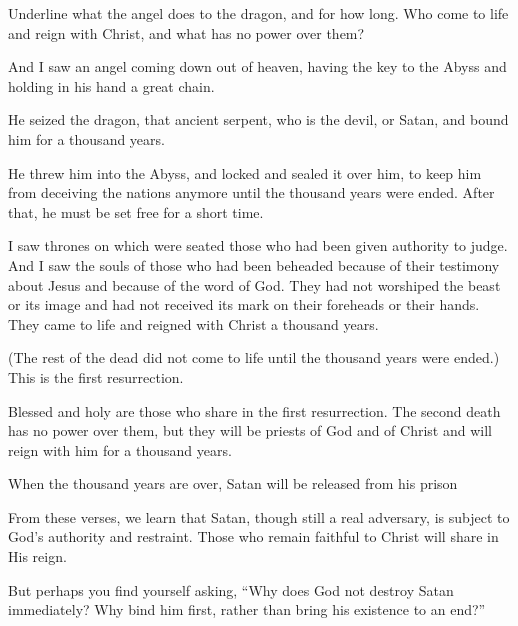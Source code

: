 \begin{ScriptureBox2}{Underline what the angel does to the dragon, and for how long. Who come to life and reign with Christ, and what has no power over them?}

\item[20:1] And I saw an angel coming down out of heaven, having the key to the Abyss and holding in his hand a great chain.

\item[20:2] He seized the dragon, that ancient serpent, who is the devil, or Satan, and bound him for a thousand years.

\item[20:3] He threw him into the Abyss, and locked and sealed it over him, to keep him from deceiving the nations anymore until the thousand years were ended. After that, he must be set free for a short time.

\item[20:4] I saw thrones on which were seated those who had been given authority to judge. And I saw the souls of those who had been beheaded because of their testimony about Jesus and because of the word of God. They had not worshiped the beast or its image and had not received its mark on their foreheads or their hands. They came to life and reigned with Christ a thousand years.

\item[20:5] (The rest of the dead did not come to life until the thousand years were ended.) This is the first resurrection.

\item[20:6] Blessed and holy are those who share in the first resurrection. The second death has no power over them, but they will be priests of God and of Christ and will reign with him for a thousand years.

\item[20:7] When the thousand years are over, Satan will be released from his prison

\end{ScriptureBox2}

From these verses, we learn that Satan, though still a real adversary, is subject to God's authority and restraint. Those who remain faithful to Christ will share in His reign.

But perhaps you find yourself asking, ``Why does God not destroy Satan immediately? Why bind him first, rather than bring his existence to an end?''

